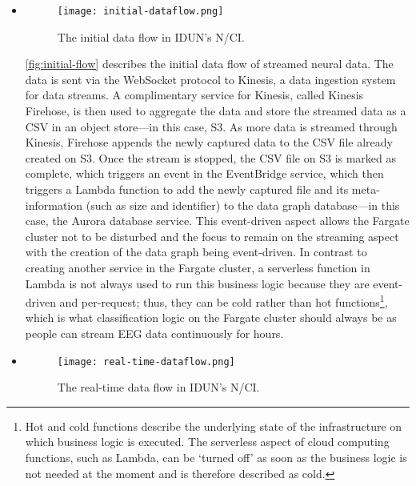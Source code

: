 \begin{itemize}
  \item  \begin{figure}[!ht]
          \centering
          \hspace*{0.4in}
          \texttt{[image: initial-dataflow.png]}
          \caption{The initial data flow in IDUN’s N/CI.}
          \label{fig:initial-flow}
        \end{figure}

        \autoref{fig:initial-flow} describes the initial data flow of streamed neural data. The data is sent via the WebSocket protocol to Kinesis, a data ingestion system for data streams. A complimentary service for Kinesis, called Kinesis Firehose, is then used to aggregate the data and store the streamed data as a CSV in an object store—in this case, S3. As more data is streamed through Kinesis, Firehose appends the newly captured data to the CSV file already created on S3. Once the stream is stopped, the CSV file on S3 is marked as complete, which triggers an event in the EventBridge service, which then triggers a Lambda function to add the newly captured file and its meta-information (such as size and identifier) to the data graph database—in this case, the Aurora database service. This event-driven aspect allows the Fargate cluster not to be disturbed and the focus to remain on the streaming aspect with the creation of the data graph being event-driven. In contrast to creating another service in the Fargate cluster, a serverless function in Lambda is not always used to run this business logic because they are event-driven and per-request; thus, they can be cold rather than hot functions\footnote{Hot and cold functions describe the underlying state of the infrastructure on which business logic is executed. The serverless aspect of cloud computing functions, such as Lambda, can be ‘turned off’ as soon as the business logic is not needed at the moment and is therefore described as cold.}, which is what classification logic on the Fargate cluster should always be as people can stream EEG data continuously for hours.

  \item  \begin{figure}[!ht]
          \centering
          \hspace*{0.4in}
          \texttt{[image: real-time-dataflow.png]}
          \caption{The real-time data flow in IDUN’s N/CI.}
          \label{fig:realtime-flow}
        \end{figure}


\end{itemize}
